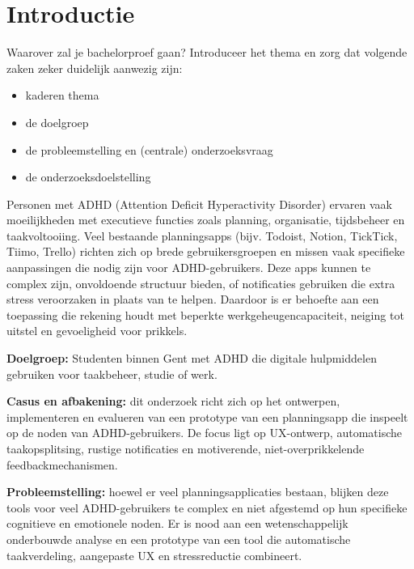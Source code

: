 
\section{Introductie}
\label{sec:inleiding}

Waarover zal je bachelorproef gaan? Introduceer het thema en zorg dat volgende zaken zeker duidelijk aanwezig zijn:
\begin{itemize}
  \item kaderen thema
  \item de doelgroep
  \item de probleemstelling en (centrale) onderzoeksvraag
  \item de onderzoeksdoelstelling
\end{itemize}

Personen met ADHD (Attention Deficit Hyperactivity Disorder) ervaren vaak moeilijkheden met executieve functies zoals planning, organisatie, tijdsbeheer en taakvoltooiing. Veel bestaande planningsapps (bijv. Todoist, Notion, TickTick, Tiimo, Trello) richten zich op brede gebruikersgroepen en missen vaak specifieke aanpassingen die nodig zijn voor ADHD-gebruikers. Deze apps kunnen te complex zijn, onvoldoende structuur bieden, of notificaties gebruiken die extra stress veroorzaken in plaats van te helpen. Daardoor is er behoefte aan een toepassing die rekening houdt met beperkte werkgeheugencapaciteit, neiging tot uitstel en gevoeligheid voor prikkels.

\medskip
\textbf{Doelgroep:} Studenten binnen Gent met ADHD die digitale hulpmiddelen gebruiken voor taakbeheer, studie of werk.

\medskip
\textbf{Casus en afbakening:} dit onderzoek richt zich op het ontwerpen, implementeren en evalueren van een prototype van een planningsapp die inspeelt op de noden van ADHD-gebruikers. De focus ligt op UX-ontwerp, automatische taakopsplitsing, rustige notificaties en motiverende, niet-overprikkelende feedbackmechanismen.

\medskip
\textbf{Probleemstelling:} hoewel er veel planningsapplicaties bestaan, blijken deze tools voor veel ADHD-gebruikers te complex en niet afgestemd op hun specifieke cognitieve en emotionele noden. Er is nood aan een wetenschappelijk onderbouwde analyse en een prototype van een tool die automatische taakverdeling, aangepaste UX en stressreductie combineert.

